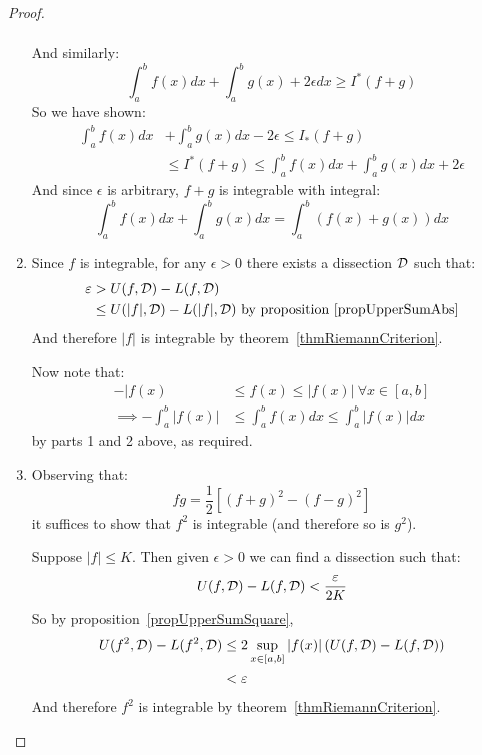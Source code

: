 \documentclass[../Main.tex]{subfiles}
\begin{document}
\begin{proof}
\begin{enumerate}
\begin{align*}
            \end{align*}
            And similarly:
            \begin{equation*}
                \int_a^b f(x) dx + \int_a^b g(x) + 2\epsilon dx \geq I^*(f + g)
            \end{equation*}
            So we have shown:
            \begin{align*}
                \int_a^b f(x) dx &+ \int_a^b g(x) dx - 2\epsilon \leq I_*(f + g)\\
                &\leq I^*(f + g) \leq \int_a^b f(x) dx + \int_a^b g(x) dx + 2\epsilon
            \end{align*}
            And since $\epsilon$ is arbitrary, $f + g$ is integrable with integral:
            \begin{equation*}
                \int_a^b f(x) dx + \int_a^b g(x) dx = \int_a^b (f(x) + g(x)) dx
            \end{equation*}
        \item Since $f$ is integrable, for any $\epsilon > 0$ there exists a dissection $\mathcal{D}$ such that:
            \begin{align*}
                \varepsilon &> U(f, \mathcal{D}) - L(f, \mathcal{D}) \\
                &\leq U(|f|, \mathcal{D}) - L(|f|, \mathcal{D}) \text{ by proposition~\ref{propUpperSumAbs}}
            \end{align*}
            And therefore $|f|$ is integrable by theorem~\ref{thmRiemannCriterion}.

            Now note that:
            \begin{align*}
                -|f(x) &\leq f(x) \leq |f(x)|~\forall x \in [a, b] \\
                \implies -\int_a^b |f(x)| &\leq \int_a^b f(x) dx \leq \int_a^b |f(x)| dx
            \end{align*}
            by parts 1 and 2 above, as required.
        \item Observing that:
            \begin{equation*}
                fg = \frac{1}{2} \left[(f + g)^2 - (f - g)^2\right]
            \end{equation*}
            it suffices to show that $f^2$ is integrable (and therefore so is $g^2$).

            Suppose $|f| \leq K$. Then given $\epsilon > 0$ we can find a dissection such that:
            \begin{equation*}
                U(f, \mathcal{D}) - L(f, \mathcal{D}) < \frac{\varepsilon}{2K}
            \end{equation*}
            So by proposition~\ref{propUpperSumSquare},
            \begin{align*}
                U(f^2, \mathcal{D}) - L(f^2, \mathcal{D}) &\leq 2 \sup_{x \in [a, b]} |f(x)| \left(U(f, \mathcal{D}) - L(f, \mathcal{D})\right) \\
                &<\varepsilon
            \end{align*}
            And therefore $f^2$ is integrable by theorem~\ref{thmRiemannCriterion}.
    \end{enumerate}
\end{proof}
\end{document}
